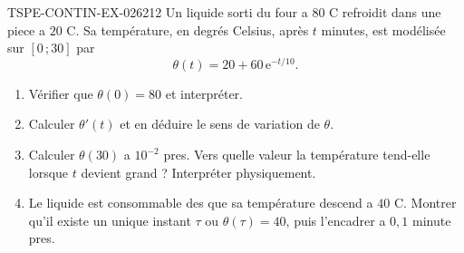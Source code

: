 \begin{exercice}{TSPE-CONTIN-EX-026}{2}{12}
Un liquide sorti du four a $80$ \textdegree C refroidit dans une piece a $20$ \textdegree C. Sa température, en degrés Celsius, après $t$ minutes, est modélisée sur $[0\,;30]$ par
\[ \theta(t) = 20 + 60\,\mathrm{e}^{-t/10}. \]
\begin{enumerate}
  \item Vérifier que $\theta(0) = 80$ et interpréter.
  \item Calculer $\theta'(t)$ et en déduire le sens de variation de $\theta$.
  \item Calculer $\theta(30)$ a $10^{-2}$ pres. Vers quelle valeur la température tend-elle lorsque $t$ devient grand ? Interpréter physiquement.
  \item Le liquide est consommable des que sa température descend a $40$ \textdegree C. Montrer qu'il existe un unique instant $\tau$ ou $\theta(\tau) = 40$, puis l'encadrer a $0{,}1$ minute pres.
\end{enumerate}
\end{exercice}
